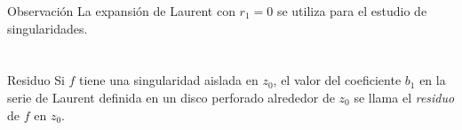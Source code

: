 \documentclass[spanish,presentation]{beamer}
\begin{document}
\begin{frame}[label=sec-2-1]{}
\begin{block}{Observación}
La expansión de Laurent con \(r_{1}=0\) se utiliza para el estudio
de singularidades.
\end{block}
\end{frame}

\section{}
\label{orgheadline1}
\begin{frame}[label=sec-3-1]{}
\begin{block}{Residuo}
Si \(f\) tiene una singularidad aislada en \(z_{0}\), el valor del
coeficiente \(b_{1}\) en la serie de Laurent definida en un disco
perforado alrededor de \(z_{0}\) se llama el \emph{residuo}
de \(f\) en \(z_{0}\).
\end{block}
\end{frame}
\end{document}
